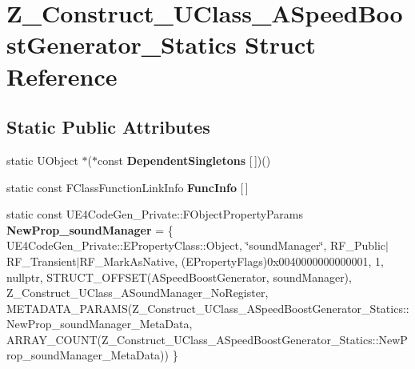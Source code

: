 \hypertarget{struct_z___construct___u_class___a_speed_boost_generator___statics}{}\section{Z\+\_\+\+Construct\+\_\+\+U\+Class\+\_\+\+A\+Speed\+Boost\+Generator\+\_\+\+Statics Struct Reference}
\label{struct_z___construct___u_class___a_speed_boost_generator___statics}
\subsection*{Static Public Attributes}
\begin{DoxyCompactItemize}
\item 
\mbox{\label{struct_z___construct___u_class___a_speed_boost_generator___statics_aa9aa2fdf4e759659e49010f76f22f50d}} 
static U\+Object $\ast$($\ast$const {\bfseries Dependent\+Singletons} \mbox{[}$\,$\mbox{]})()
\item 
static const F\+Class\+Function\+Link\+Info {\bfseries Func\+Info} \mbox{[}$\,$\mbox{]}
\item 
\mbox{\label{struct_z___construct___u_class___a_speed_boost_generator___statics_a2427fc57c611e9d14a7dbab72019fbd9}} 
static const U\+E4\+Code\+Gen\+\_\+\+Private\+::\+F\+Object\+Property\+Params {\bfseries New\+Prop\+\_\+sound\+Manager} = \{ U\+E4\+Code\+Gen\+\_\+\+Private\+::\+E\+Property\+Class\+::\+Object, \char`\"{}sound\+Manager\char`\"{}, R\+F\+\_\+\+Public$\vert$R\+F\+\_\+\+Transient$\vert$R\+F\+\_\+\+Mark\+As\+Native, (E\+Property\+Flags)0x0040000000000001, 1, nullptr, S\+T\+R\+U\+C\+T\+\_\+\+O\+F\+F\+S\+E\+T(\+A\+Speed\+Boost\+Generator, sound\+Manager), Z\+\_\+\+Construct\+\_\+\+U\+Class\+\_\+\+A\+Sound\+Manager\+\_\+\+No\+Register, M\+E\+T\+A\+D\+A\+T\+A\+\_\+\+P\+A\+R\+A\+M\+S(\+Z\+\_\+\+Construct\+\_\+\+U\+Class\+\_\+\+A\+Speed\+Boost\+Generator\+\_\+\+Statics\+::\+New\+Prop\+\_\+sound\+Manager\+\_\+\+Meta\+Data, A\+R\+R\+A\+Y\+\_\+\+C\+O\+U\+N\+T(\+Z\+\_\+\+Construct\+\_\+\+U\+Class\+\_\+\+A\+Speed\+Boost\+Generator\+\_\+\+Statics\+::\+New\+Prop\+\_\+sound\+Manager\+\_\+\+Meta\+Data)) \}
\item 
\mbox{\label{struct_z___construct___u_class___a_speed_boost_generator___statics_a40513039ee6446b76f544c9e6e94946d}} 

\end{DoxyCompactItemize}

